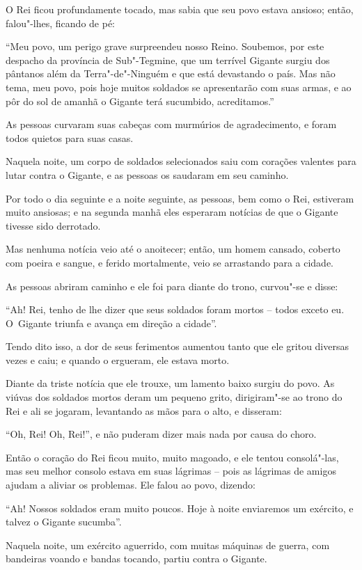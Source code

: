O Rei ficou profundamente tocado, mas sabia que seu povo estava ansioso;
então, falou"-lhes, ficando de pé:

``Meu povo, um perigo grave surpreendeu nosso Reino. Soubemos, por este
despacho da província de Sub"-Tegmine, que um terrível Gigante surgiu dos
pântanos além da Terra"-de"-Ninguém e que está devastando o país. Mas não
tema, meu povo, pois hoje muitos soldados se apresentarão com suas
armas, e ao pôr do sol de amanhã o Gigante terá sucumbido,
acreditamos.''

As pessoas curvaram suas cabeças com murmúrios de agradecimento, e foram
todos quietos para suas casas.

Naquela noite, um corpo de soldados selecionados saiu com corações
valentes para lutar contra o Gigante, e as pessoas os saudaram em seu
caminho.

Por todo o dia seguinte e a noite seguinte, as pessoas, bem como o Rei,
estiveram muito ansiosas; e na segunda manhã eles esperaram notícias de
que o Gigante tivesse sido derrotado.

Mas nenhuma notícia veio até o anoitecer; então, um homem cansado,
coberto com poeira e sangue, e ferido mortalmente, veio se arrastando
para a cidade.

As pessoas abriram caminho e ele foi para diante do trono, curvou"-se e
disse:

``Ah! Rei, tenho de lhe dizer que seus soldados foram mortos -- todos
exceto eu. O~Gigante triunfa e avança em direção a cidade''.

Tendo dito isso, a dor de seus ferimentos aumentou tanto que ele gritou
diversas vezes e caiu; e quando o ergueram, ele estava morto.

Diante da triste notícia que ele trouxe, um lamento baixo surgiu do
povo. As viúvas dos soldados mortos deram um pequeno grito, dirigiram"-se
ao trono do Rei e ali se jogaram, levantando as mãos para o alto, e
disseram:

``Oh, Rei! Oh, Rei!'', e não puderam dizer mais nada por causa do choro.

Então o coração do Rei ficou muito, muito magoado, e ele tentou
consolá"-las, mas seu melhor consolo estava em suas lágrimas -- pois as
lágrimas de amigos ajudam a aliviar os problemas. Ele falou ao povo,
dizendo:

``Ah! Nossos soldados eram muito poucos. Hoje à noite enviaremos um
exército, e talvez o Gigante sucumba''.

Naquela noite, um exército aguerrido, com muitas máquinas de guerra, com
bandeiras voando e bandas tocando, partiu contra o Gigante.

